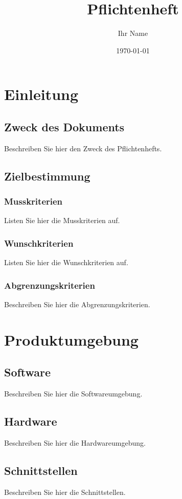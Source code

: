 \documentclass[a4paper,12pt]{article}
\title{Pflichtenheft}
\author{Ihr Name}
\date{\today}
\begin{document}
\maketitle

\tableofcontents

\section{Einleitung}
\subsection{Zweck des Dokuments}
Beschreiben Sie hier den Zweck des Pflichtenhefts.

\subsection{Zielbestimmung}
\subsubsection{Musskriterien}
Listen Sie hier die Musskriterien auf.

\subsubsection{Wunschkriterien}
Listen Sie hier die Wunschkriterien auf.

\subsubsection{Abgrenzungskriterien}
Beschreiben Sie hier die Abgrenzungskriterien.

\section{Produktumgebung}
\subsection{Software}
Beschreiben Sie hier die Softwareumgebung.

\subsection{Hardware}
Beschreiben Sie hier die Hardwareumgebung.

\subsection{Schnittstellen}
Beschreiben Sie hier die Schnittstellen.
\end{document}

